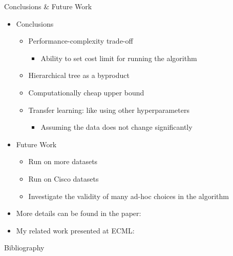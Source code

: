 \documentclass[10pt]{beamer}
\begin{document}
\begin{frame}{Conclusions \& Future Work}
    \begin{itemize}
        \item Conclusions
        \begin{itemize}
            \item Performance-complexity trade-off
            \begin{itemize}
                \item Ability to set cost limit for running the algorithm
            \end{itemize}
            \item Hierarchical tree as a byproduct
            \item Computationally cheap upper bound
            \item Transfer learning: like using other hyperparameters
            \begin{itemize}
                \item Assuming the data does not change significantly
            \end{itemize}
        \end{itemize}
        
        \item Future Work
        \begin{itemize}
            \item Run on more datasets
            \item Run on Cisco datasets
            \item Investigate the validity of many ad-hoc choices in the algorithm
        \end{itemize}
        
    \item More details can be found in the paper: \cite{prochazka_scalable_2022}
    \item My related work presented at ECML: \cite{dedic_adaptive_2022}
    \end{itemize}
\end{frame}

\begin{frame}{Bibliography}
    \renewcommand*{\bibfont}{\footnotesize}
    \printbibliography
\end{frame}

\begin{frame}
    \titlepage
\end{frame}
\end{document}

